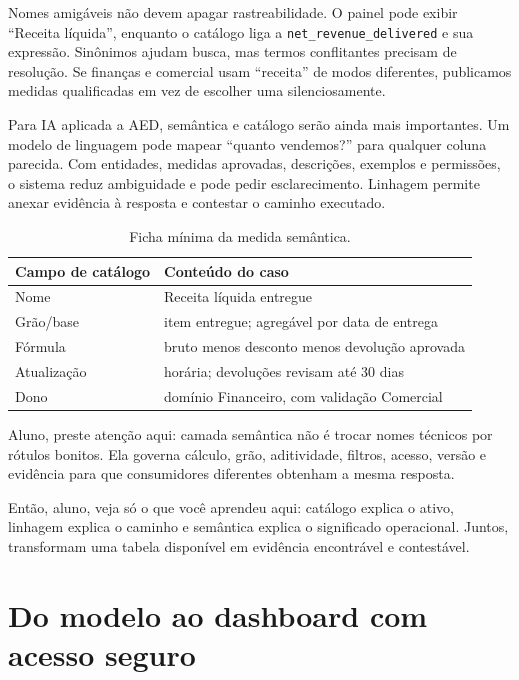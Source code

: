 Nomes amigáveis não devem apagar rastreabilidade. O painel pode exibir ``Receita líquida'', enquanto o catálogo liga a \texttt{net\_revenue\_delivered} e sua expressão. Sinônimos ajudam busca, mas termos conflitantes precisam de resolução. Se finanças e comercial usam ``receita'' de modos diferentes, publicamos medidas qualificadas em vez de escolher uma silenciosamente.

Para IA aplicada a AED, semântica e catálogo serão ainda mais importantes. Um modelo de linguagem pode mapear ``quanto vendemos?'' para qualquer coluna parecida. Com entidades, medidas aprovadas, descrições, exemplos e permissões, o sistema reduz ambiguidade e pode pedir esclarecimento. Linhagem permite anexar evidência à resposta e contestar o caminho executado.

\begin{table}[htbp]
\centering
\small
\caption{Ficha mínima da medida semântica.}
\label{tab:ficha-semantica}
\begin{tabularx}{0.95\textwidth}{@{}p{3.1cm}Y@{}}
\toprule
\textbf{Campo de catálogo} & \textbf{Conteúdo do caso} \\
\midrule
Nome & Receita líquida entregue \\
Grão/base & item entregue; agregável por data de entrega \\
Fórmula & bruto menos desconto menos devolução aprovada \\
Atualização & horária; devoluções revisam até 30 dias \\
Dono & domínio Financeiro, com validação Comercial \\
\bottomrule
\end{tabularx}
\end{table}

\begin{GuidedBox}
Aluno, preste atenção aqui: camada semântica não é trocar nomes técnicos por rótulos bonitos. Ela governa cálculo, grão, aditividade, filtros, acesso, versão e evidência para que consumidores diferentes obtenham a mesma resposta.
\end{GuidedBox}

\begin{SummaryBox}
Então, aluno, veja só o que você aprendeu aqui: catálogo explica o ativo, linhagem explica o caminho e semântica explica o significado operacional. Juntos, transformam uma tabela disponível em evidência encontrável e contestável.
\end{SummaryBox}

\section{Do modelo ao dashboard com acesso seguro}

